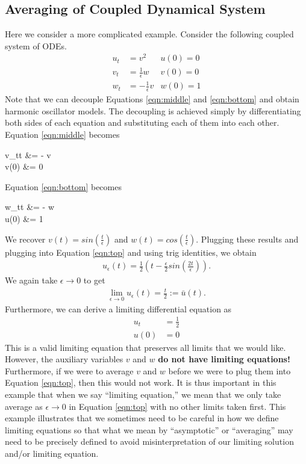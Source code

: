 \subsection{Averaging of Coupled Dynamical System}
Here we consider a more complicated example. Consider the following coupled system of ODEs. 
\begin{align} \label{eqn:avgdyncoupled}
u_{t} &= v^2 & u(0) = 0 \label{eqn:top} \\
v_{t} &= \frac{1}{\epsilon} w & v(0) = 0 \label{eqn:middle} \\
w_{t} &= -\frac{1}{\epsilon} v & w(0) = 1 \label{eqn:bottom}
\end{align}
Note that we can decouple Equations \ref{eqn:middle} and \ref{eqn:bottom} and obtain harmonic oscillator models. The decoupling is achieved simply by differentiating both sides of each equation and substituting each of them into each other. Equation \ref{eqn:middle} becomes
\begin{ceqn} \label{eqn:middleuncoupled}
v_{tt} &= - v \\
v(0) &= 0
\end{ceqn}
Equation \ref{eqn:bottom} becomes
\begin{ceqn} \label{eqn:bottomuncoupled}
w_{tt} &= - w \\
u(0) &= 1
\end{ceqn}
We recover $v(t) = sin\left(\frac{t}{\epsilon}\right)$ and $w(t) = cos\left( \frac{t}{\epsilon} \right)$. Plugging these results and plugging into Equation \ref{eqn:top} and using trig identities, we obtain
\begin{align} \label{eqn:avgdyncoupledsoln}
u_{\epsilon}(t) = \frac{1}{2}\left(t - \frac{\epsilon}{2} sin\left(\frac{2t}{\epsilon}\right)\right).
\end{align}
We again take $\epsilon \to 0$ to get
\begin{align} \label{eqn:avgdyncoupledlimit}
\lim_{\epsilon \to 0} u_{\epsilon}(t) = \frac{t}{2} := \bar{u}(t).
\end{align}
Furthermore, we can derive a limiting differential equation as 
\begin{align} \label{eqn:avgdynlimiteqn}
u_{t} &= \frac{1}{2} \\
u(0) &= 0
\end{align}
This is a valid limiting equation that preserves all limits that we would like. However, the auxiliary variables $v$ and $w$ \textbf{do not have limiting equations!} Furthermore, if we were to average $v$ and $w$ before we were to plug them into Equation \ref{eqn:top}, then this would not work. It is thus important in this example that when we say ``limiting equation,'' we mean that we only take average as $\epsilon \to 0$ in Equation \ref{eqn:top}  with no other limits taken first. This example illustrates that we sometimes need to be careful in how we define limiting equations so that what we mean by ``asymptotic'' or ``averaging'' may need to be precisely defined to avoid misinterpretation of our limiting solution and/or limiting equation.

